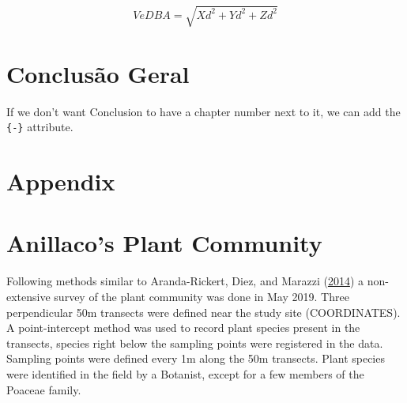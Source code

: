\documentclass[msc,numbers,hidelinks]{coppe}
\begin{document}
  \[ VeDBA = \sqrt{Xd^2 + Yd^2 + Zd^2} \]

  \hypertarget{conclusuxe3o-geral}{%
  \chapter*{Conclusão Geral}\label{conclusuxe3o-geral}}

  If we don't want Conclusion to have a chapter number next to it, we can add the \texttt{\{-\}} attribute.

  \appendix

  \appendix

  \hypertarget{appendix}{%
  \chapter*{Appendix}\label{appendix}}

  \hypertarget{anillacos-plant-community}{%
  \chapter{Anillaco's Plant Community}\label{anillacos-plant-community}}

  Following methods similar to Aranda-Rickert, Diez, and Marazzi (\protect\hyperlink{ref-aranda-rickertExtrafloralNectarFuels2014}{2014}) a non-extensive survey of the plant community was done in May 2019. Three perpendicular 50m transects were defined near the study site (COORDINATES). A point-intercept method was used to record plant species present in the transects, species right below the sampling points were registered in the data. Sampling points were defined every 1m along the 50m transects. Plant species were identified in the field by a Botanist, except for a few members of the Poaceae family.
\end{document}
